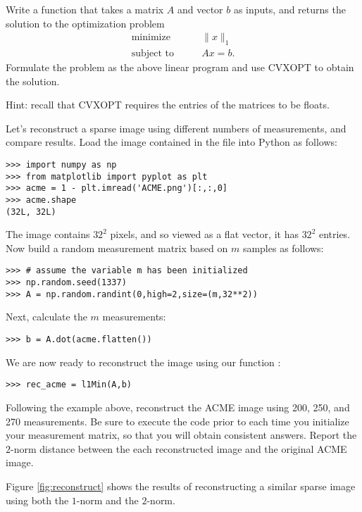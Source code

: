 \begin{problem}
Write a function  that takes a matrix $A$ and vector $b$ as inputs, and returns the solution to the 
optimization problem 
\begin{align*}
\text{minimize}\qquad &\|x\|_1\\
\text{subject to} \qquad &Ax = b.
\end{align*}
Formulate the problem as the above linear program and use CVXOPT to obtain the solution.

Hint: recall that CVXOPT requires the entries of the matrices to be floats.
\end{problem}

Let's reconstruct a sparse image using different numbers of measurements, and compare results.
Load the image contained in the file  into Python as follows:
\begin{lstlisting}
>>> import numpy as np
>>> from matplotlib import pyplot as plt
>>> acme = 1 - plt.imread('ACME.png')[:,:,0]
>>> acme.shape
(32L, 32L)
\end{lstlisting}
The image contains $32^2$ pixels, and so viewed as a flat vector, it has $32^2$ entries.
Now build a random measurement matrix based on $m$ samples as follows:
\begin{lstlisting}
>>> # assume the variable m has been initialized
>>> np.random.seed(1337)
>>> A = np.random.randint(0,high=2,size=(m,32**2))
\end{lstlisting}
Next, calculate the $m$ measurements:
\begin{lstlisting}
>>> b = A.dot(acme.flatten())
\end{lstlisting}
We are now ready to reconstruct the image using our function :
\begin{lstlisting}
>>> rec_acme = l1Min(A,b)
\end{lstlisting}

\begin{problem}
Following the example above, reconstruct the ACME image using 200, 250, and 270 measurements.
Be sure to execute the code  prior to each time you initialize
your measurement matrix, so that you will obtain consistent answers. Report the $2$-norm
distance between the each reconstructed image and the original ACME image. 
\end{problem}

Figure \ref{fig:reconstruct} shows the results of reconstructing a similar sparse image using both the $1$-norm and 
the $2$-norm.

